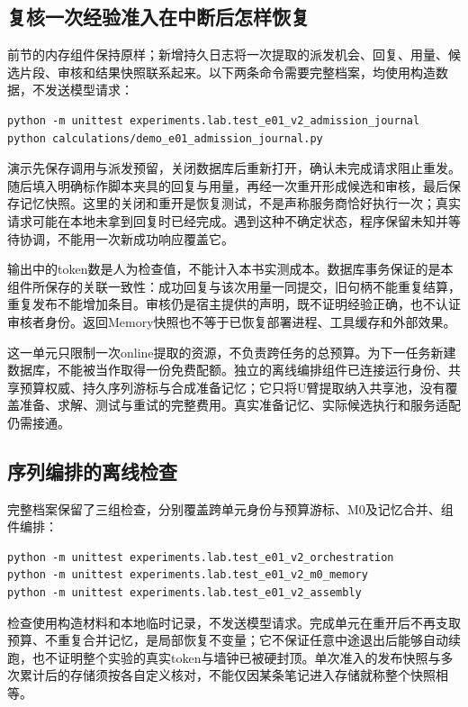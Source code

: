 \begin{samepage}
\subsection{复核一次经验准入在中断后怎样恢复}

前节的内存组件保持原样；新增持久日志将一次提取的派发机会、回复、用量、候选片段、审核和结果快照联系起来。以下两条命令需要完整档案，均使用构造数据，不发送模型请求：
\begin{verbatim}
python -m unittest experiments.lab.test_e01_v2_admission_journal
python calculations/demo_e01_admission_journal.py
\end{verbatim}
\end{samepage}

演示先保存调用与派发预留，关闭数据库后重新打开，确认未完成请求阻止重发。随后填入明确标作脚本夹具的回复与用量，再经一次重开形成候选和审核，最后保存记忆快照。这里的关闭和重开是恢复测试，不是声称服务商恰好执行一次；真实请求可能在本地未拿到回复时已经完成。遇到这种不确定状态，程序保留未知并等待协调，不能用一次新成功响应覆盖它。

输出中的token数是人为检查值，不能计入本书实测成本。数据库事务保证的是本组件所保存的关联一致性：成功回复与该次用量一同提交，旧句柄不能重复结算，重复发布不能增加条目。审核仍是宿主提供的声明，既不证明经验正确，也不认证审核者身份。返回Memory快照也不等于已恢复部署进程、工具缓存和外部效果。

这一单元只限制一次online提取的资源，不负责跨任务的总预算。为下一任务新建数据库，不能被当作取得一份免费配额。独立的离线编排组件已连接运行身份、共享预算权威、持久序列游标与合成准备记忆；它只将U臂提取纳入共享池，没有覆盖准备、求解、测试与重试的完整费用。真实准备记忆、实际候选执行和服务适配仍需接通。

\subsection{序列编排的离线检查}

完整档案保留了三组检查，分别覆盖跨单元身份与预算游标、M0及记忆合并、组件编排：
\begin{verbatim}
python -m unittest experiments.lab.test_e01_v2_orchestration
python -m unittest experiments.lab.test_e01_v2_m0_memory
python -m unittest experiments.lab.test_e01_v2_assembly
\end{verbatim}
检查使用构造材料和本地临时记录，不发送模型请求。完成单元在重开后不再支取预算、不重复合并记忆，是局部恢复不变量；它不保证任意中途退出后能够自动续跑，也不证明整个实验的真实token与墙钟已被硬封顶。单次准入的发布快照与多次累计后的存储须按各自定义核对，不能仅因某条笔记进入存储就称整个快照相等。

